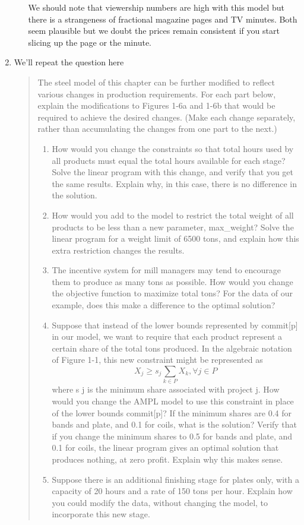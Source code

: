 \documentclass[11pt]{article}
\begin{document}
\begin{enumerate}
\begin{enumerate}
We should note that viewership numbers are high with this model but there is a strangeness of fractional magazine pages and TV minutes.  Both seem plausible but we doubt the prices remain consistent if you start slicing up the page or the minute. 
\end{enumerate}

\item We'll repeat the question here
\begin{quote}
The steel model of this chapter can be further modified to reflect various changes in production requirements. For each part below, explain the modifications to Figures 1-6a and 1-6b that
would be required to achieve the desired changes. (Make each change separately, rather than accumulating the changes from one part to the next.)

\begin{enumerate}
\item How would you change the constraints so that total hours used by all products must equal the total hours available for each stage? Solve the linear program with this change, and verify that you
get the same results. Explain why, in this case, there is no difference in the solution.
\item How would you add to the model to restrict the total weight of all products to be less than a
new parameter, max\_weight? Solve the linear program for a weight limit of 6500 tons, and
explain how this extra restriction changes the results.
\item The incentive system for mill managers may tend to encourage them to produce as many tons as
possible. How would you change the objective function to maximize total tons? For the data of
our example, does this make a difference to the optimal solution?
\item Suppose that instead of the lower bounds represented by commit[p] in our model, we want to
require that each product represent a certain share of the total tons produced. In the algebraic notation of Figure 1-1, this new constraint might be represented as
\[
X_j \geq s_j\sum_{k\in P} X_k, \forall j \in P
\]
where s j is the minimum share associated with project j. How would you change the AMPL model
to use this constraint in place of the lower bounds commit[p]? If the minimum shares are 0.4 for
bands and plate, and 0.1 for coils, what is the solution?  Verify that if you change the minimum shares to 0.5 for bands and plate, and 0.1 for coils, the linear program gives an optimal solution that produces nothing, at zero profit. Explain why this makes sense.
\item Suppose there is an additional finishing stage for plates only, with a capacity of 20 hours and a
rate of 150 tons per hour. Explain how you could modify the data, without changing the model, to
incorporate this new stage.
\end{enumerate}
\end{quote}


\end{enumerate}
\end{document}
